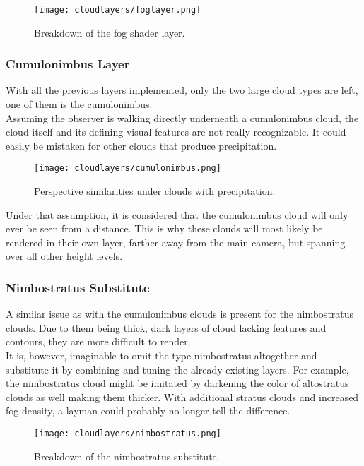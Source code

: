 \begin{figure}[H]
    \texttt{[image: cloudlayers/foglayer.png]}
    \caption{Breakdown of the fog shader layer.}
    \label{img:cloudlayer:fog}
\end{figure}

\pagebreak

\subsubsection{Cumulonimbus Layer}
\label{section:impl:layers:cumulonimbus}
With all the previous layers implemented, only the two large cloud types are left, one of them is the cumulonimbus.
\\
Assuming the observer is walking directly underneath a cumulonimbus cloud, the cloud itself and its defining visual features are not really recognizable.
It could easily be mistaken for other clouds that produce \gls{precipitation}.

\begin{figure}[H]
    \texttt{[image: cloudlayers/cumulonimbus.png]}
    \caption{Perspective similarities under clouds with \gls{precipitation}.}
    \label{img:cloudlayer:cumulonimbus}
\end{figure}

\noindent
Under that assumption, it is considered that the cumulonimbus cloud will only ever be seen from a distance.
This is why these clouds will most likely be rendered in their own layer, farther away from the main camera, but spanning over all other height levels.

\pagebreak

\subsubsection{Nimbostratus Substitute}
A similar issue as with the cumulonimbus clouds is present for the nimbostratus clouds.
Due to them being thick, dark layers of cloud lacking features and contours, they are more difficult to render.
\\
It is, however, imaginable to omit the type nimbostratus altogether and substitute it by combining and tuning the already existing layers.
For example, the nimbostratus cloud might be imitated by darkening the color of altostratus clouds as well making them thicker. 
With additional stratus clouds and increased fog density, a layman could probably no longer tell the difference.

\begin{figure}[H]
    \texttt{[image: cloudlayers/nimbostratus.png]}
    \caption{Breakdown of the nimbostratus substitute.}
    \label{img:cloudlayer:nimbostratus}
\end{figure}

